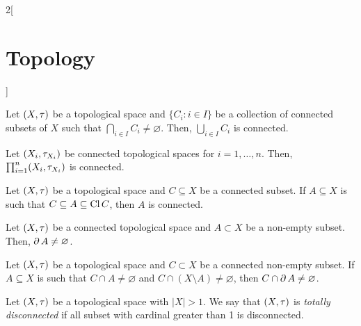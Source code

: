 \documentclass[../../../main.tex]{subfiles}
\begin{document}
\begin{multicols}{2}[\section{Topology}]
\begin{lemma}
    \end{lemma}
    \begin{prop}
        Let $(X,\tau)$ be a topological space and $\{C_i:i\in I\}$ be a collection of connected subsets of $X$ such that $\bigcap_{i\in I} C_i\ne\varnothing$. Then, $\bigcup_{i\in I} C_i$ is connected.
    \end{prop}
    \begin{theorem}
        Let $(X_i,\tau_{X_i})$ be connected topological spaces for $i=1,\ldots,n$. Then, $\prod_{i=1}^n(X_i,\tau_{X_i})$ is connected.
    \end{theorem}
    \begin{theorem}
        Let $(X,\tau)$ be a topological space and $C\subseteq X$ be a connected subset. If $A\subseteq X$ is such that $C\subseteq A\subseteq \operatorname{Cl} C$, then $A$ is connected.
    \end{theorem}
    \begin{prop}
        Let $(X,\tau)$ be a connected topological space and $A\subset X$ be a non-empty subset. Then, $\operatorname{\partial} A\ne\varnothing$.
    \end{prop}
    \begin{prop}
        Let $(X,\tau)$ be a topological space and $C\subset X$ be a connected non-empty subset. If $A\subseteq X$ is such that $C\cap A\ne\varnothing$ and $C\cap(X\setminus A)\ne\varnothing$, then $C\cap\operatorname{\partial} A\ne\varnothing$.
    \end{prop}
    \begin{definition}
        Let $(X,\tau)$ be a topological space with $|X|>1$. We say that $(X,\tau)$ is \emph{totally disconnected} if all subset with cardinal greater than 1 is disconnected.
    \end{definition}

\end{multicols}
\end{document}
